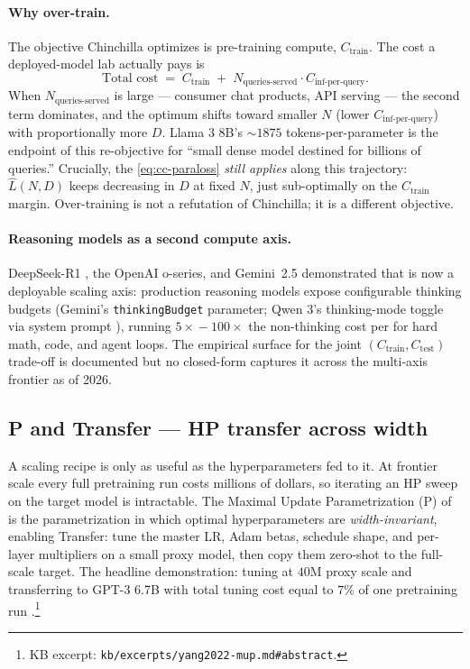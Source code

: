 \paragraph{Why over-train.}
The objective Chinchilla optimizes is pre-training compute,
$C_{\text{train}}$. The cost a deployed-model lab actually pays is
\begin{equation}
\text{Total cost} \;=\; C_{\text{train}} \;+\; N_{\text{queries-served}} \cdot C_{\text{inf-per-query}}.
\label{eq:total-cost}
\end{equation}
When $N_{\text{queries-served}}$ is large --- consumer chat products,
API serving --- the second term dominates, and the optimum shifts
toward smaller $N$ (lower $C_{\text{inf-per-query}}$) with proportionally
more $D$. Llama 3 8B's $\sim 1875$ tokens-per-parameter is the endpoint
of this re-objective for ``small dense model destined for billions of
queries.'' Crucially, the  \cref{eq:cc-paraloss}
\emph{still applies} along this trajectory: $\hat{L}(N, D)$ keeps
decreasing in $D$ at fixed $N$, just sub-optimally on the
$C_{\text{train}}$ margin. Over-training is not a refutation of
Chinchilla; it is a different objective.

\paragraph{Reasoning models as a second compute axis.}
DeepSeek-R1 \citep{deepseek-r1}, the OpenAI o-series, and Gemini~2.5
\citep{gemini2-5} demonstrated that  is now a
deployable scaling axis: production reasoning models expose
configurable thinking budgets (Gemini's \texttt{thinkingBudget}
parameter; Qwen 3's thinking-mode toggle via system prompt
\citep{qwen3}), running $5\!\times\!\!-\!\!100\!\times$ the
non-thinking cost per  for hard math, code, and agent loops. The
empirical surface for the joint $(C_{\text{train}}, C_{\text{test}})$
trade-off is documented but no closed-form  captures it
across the multi-axis frontier as of 2026.

\subsection{\textmu P and \textmu Transfer --- HP transfer across width}
\label{sec:scaling-mup}

A scaling recipe is only as useful as the hyperparameters fed to it.
At frontier scale every full pretraining run costs millions of dollars,
so iterating an HP sweep on the target model is intractable. The
Maximal Update Parametrization (\textmu P) of \citet{yang2022-mup} is
the parametrization in which optimal hyperparameters are
\emph{width-invariant}, enabling \textmu Transfer: tune the master LR,
Adam betas, schedule shape, and per-layer multipliers on a small proxy
model, then copy them zero-shot to the full-scale target. The headline
demonstration: tuning at $40\text{M}$ proxy scale and transferring to
GPT-3 6.7B with total tuning cost equal to $7\%$ of one pretraining
run \citep[abstract]{yang2022-mup}.\footnote{KB excerpt:
\texttt{kb/excerpts/yang2022-mup.md\#abstract}.}

